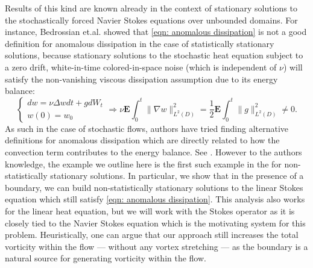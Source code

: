 \documentclass[11pt, reqno]{article}
\def\grad{\nabla}
\def\E{\mathbf{E}}
\begin{document}
Results of this kind are known already in the context of stationary solutions to the stochastically forced Navier Stokes equations over unbounded domains. For instance, Bedrossian et.al. \cite{bedrossian2019sufficient} showed that \eqref{eqn: anomalous dissipation} is not a good definition for anomalous dissipation in the case of statistically stationary solutions, because stationary solutions to the stochastic heat equation subject to a zero drift, white-in-time colored-in-space noise (which is independent of $\nu$) will satisfy the non-vanishing viscous dissipation assumption due to its energy balance:
\[
    \begin{cases}
        dw = \nu \Delta w dt + gdW_t\\
        w(0) = w_0
    \end{cases} \Rightarrow \nu\E\int_0^t\|\grad w\|_{L^2(D)}^2 = \frac{1}{2}\E\int_0^t\|g\|_{L^2(D)}^2 \neq 0.
\]
As such in the case of stochastic flows, authors have tried finding alternative definitions for anomalous dissipation which are directly related to how the convection term contributes to the energy balance. See \cites{bedrossian2019sufficient, papathanasiou2021sufficient, dudley2024necessary, drivas2022self}. However to the authors knowledge, the example we outline here is the first such example in the for non-statistically stationary solutions. 
In particular, we show that in the presence of a boundary, we can build non-statistically stationary solutions to the linear Stokes equation which still satisfy \eqref{eqn: anomalous dissipation}. This analysis also works for the linear heat equation, but we will work with the Stokes operator as it is closely tied to the Navier Stokes equation which is the motivating system for this problem. Heuristically, one can argue that our approach still increases the total vorticity within the flow --- without any vortex stretching --- as the boundary is a natural source for generating vorticity within the flow.
\end{document}
